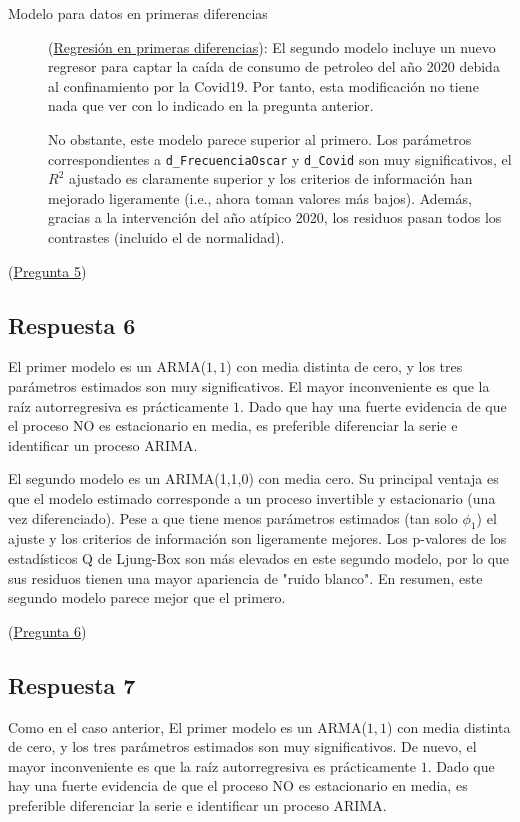 \documentclass[10pt]{article}
\begin{document}
\begin{description}
\item[{Modelo para datos en primeras diferencias}] (\hyperref[sec:orgbc115b4]{Regresión en primeras diferencias}): El segundo modelo incluye un nuevo regresor para
captar la caída de consumo de petroleo del año 2020 debida al
confinamiento por la Covid19. Por tanto, esta modificación no tiene
nada que ver con lo indicado en la pregunta anterior.

No obstante, este modelo parece superior al primero. Los parámetros
correspondientes a \texttt{d\_FrecuenciaOscar} y \texttt{d\_Covid} son muy
significativos, el \(R^2\) ajustado es claramente superior y los
criterios de información han mejorado ligeramente (i.e., ahora toman
valores más bajos). Además, gracias a la intervención del año
atípico 2020, los residuos pasan todos los contrastes (incluido el
de normalidad).
\end{description}

(\hyperref[sec:org2fcc0fe]{Pregunta 5})
\subsection*{Respuesta 6}
\label{sec:org5d024f4}

El primer modelo es un ARMA(\(1,1\)) con media distinta de cero, y los
tres parámetros estimados son muy significativos. El mayor
inconveniente es que la raíz autorregresiva es prácticamente \(1\). Dado
que hay una fuerte evidencia de que el proceso NO es estacionario en
media, es preferible diferenciar la serie e identificar un proceso
ARIMA.

El segundo modelo es un ARIMA(1,1,0) con media cero. Su principal
ventaja es que el modelo estimado corresponde a un proceso invertible
y estacionario (una vez diferenciado).  Pese a que tiene menos
parámetros estimados (tan solo \(\phi_1\)) el ajuste y los criterios de
información son ligeramente mejores. Los p-valores de los estadísticos
Q de Ljung-Box son más elevados en este segundo modelo, por lo que sus
residuos tienen una mayor apariencia de "ruido blanco". En resumen,
este segundo modelo parece mejor que el primero.

(\hyperref[sec:orge17419d]{Pregunta 6})
\subsection*{Respuesta 7}
\label{sec:org0535863}

Como en el caso anterior, El primer modelo es un ARMA(\(1,1\)) con media
distinta de cero, y los tres parámetros estimados son muy
significativos. De nuevo, el mayor inconveniente es que la raíz
autorregresiva es prácticamente \(1\). Dado que hay una fuerte evidencia
de que el proceso NO es estacionario en media, es preferible
diferenciar la serie e identificar un proceso ARIMA.
\end{document}
